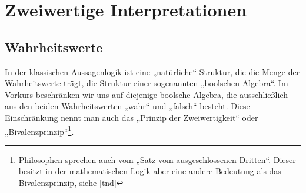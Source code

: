 \section{Zweiwertige Interpretationen}



\subsection{Wahrheitswerte}


\begin{bem}[Bivalenzprinzip] \label{bivalenz}
In der klassischen Aussagenlogik ist eine „natürliche“ Struktur, die die Menge der Wahrheitswerte trägt, die Struktur einer sogenannten „boolschen Algebra“. Im Vorkurs beschränken wir uns auf diejenige boolsche Algebra, die ausschließlich aus den beiden Wahrheitswerten „wahr“ und „falsch“ besteht. Diese Einschränkung nennt man auch das „Prinzip der Zweiwertigkeit“ oder „Bivalenzprinzip“\footnote{Philosophen sprechen auch vom „Satz vom ausgeschlossenen Dritten“. Dieser besitzt in der mathematischen Logik aber eine andere Bedeutung als das Bivalenzprinzip, siehe \cref{tnd}}.
\end{bem}


\begin{comment}
\begin{bem}[* „Konstante“ Aussagen]
In der Aussagenlogik kann es bequem sein, Aussagezeichen einzuführen, die für eine Aussage stehen, die stets wahr oder stets falsch sein sollen:
\begin{itemize}
 \item Mit „$\top$“ (wie englisch ``true'') ist eine Aussage gemeint, die in einem absoluten Sinn immer wahr sein soll.
 \item Mit „$\bot$“ ist eine Aussage gemeint, die in einem absoluten Sinn falsch sein soll, unabhängig davon, wie sie interpretiert wird.
 \end{itemize}
 \end{bem}
 \end{comment}
 



